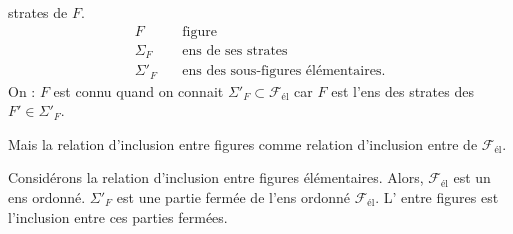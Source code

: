 strates de $F$. 
\[
\begin{aligned}
 F &\quad \text{figure}\\
 \Sigma_F &\quad \text{ens de ses strates}\\
 \Sigma'_F &\quad \text{ens des sous-figures élémentaires.}
\end{aligned}
\]
On :
$F$ est connu quand on connait $\Sigma'_F\subset\mathcal{F}_{\text{él}}$ car $F$ est l'ens des strates des $F'\in\Sigma'_F$.

Mais la relation d'inclusion entre figures  comme relation d'inclusion entre  de $\mathcal{F}_{\text{él}}$.


Considérons la relation d'inclusion \inserted{$\leq$} entre figures élémentaires. Alors, $\mathcal{F}_{\text{él}}$ est un ens ordonné.     $\Sigma'_F$ est une partie fermée de l'ens ordonné $\mathcal{F}_{\text{él}}$. L' entre figures est l'inclusion entre ces parties fermées.
